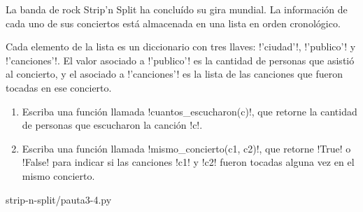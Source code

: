 La banda de rock Strip'n Split
ha concluído su gira mundial.
La información de cada uno de sus conciertos
está almacenada en una lista
en orden cronológico.

\begin{minipage}[t]{.45\textwidth}
  Cada elemento de la lista
  es un diccionario con tres llaves:
  \li!'ciudad'!, \li!'publico'! y \li!'canciones'!.
  El valor asociado a \li!'publico'!
  es la cantidad de personas que asistió al concierto,
  y el asociado a \li!'canciones'!
  es la lista de las canciones que fueron tocadas
  en ese concierto.

  \begin{enumerate}
    \item
      Escriba una función llamada
      \li!cuantos_escucharon(c)!,
      que retorne la cantidad de personas
      que escucharon la canción \li!c!.
    \item
      Escriba una función llamada
      \li!mismo_concierto(c1, c2)!,
      que retorne \li!True! o \li!False!
      para indicar si las canciones \li!c1! y \li!c2!
      fueron tocadas alguna vez en el mismo concierto.
  \end{enumerate}
\end{minipage}
\hspace{2em}
\begin{minipage}[t]{.55\textwidth}
  \small
  
     {strip-n-split/pauta3-4.py}
\end{minipage}

